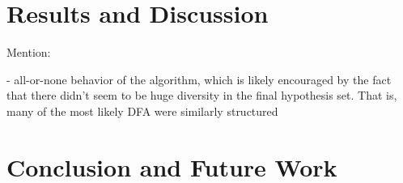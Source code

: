 \documentclass[10pt,letterpaper]{article}
\begin{document}
\section{Results and Discussion}
Mention:

- all-or-none behavior of the algorithm, which is likely encouraged by the fact that there didn't seem to be huge diversity in the final hypothesis set. That is, many of the most likely DFA were similarly structured
\section{Conclusion and Future Work}







\end{document}
